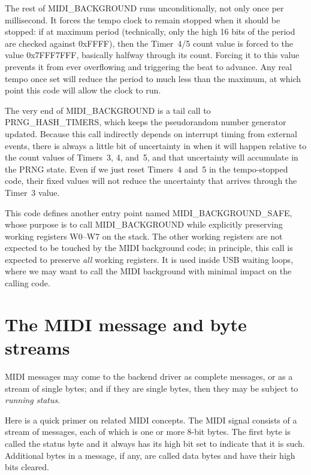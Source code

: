 The rest of MIDI\_BACKGROUND runs unconditionally, not only once per
millisecond.  It forces the tempo clock to remain stopped when it should be
stopped:  if at maximum period (technically, only the high 16 bits of the
period are checked against 0xFFFF), then the Timer~4/5 count value is forced
to the value 0x7FFF7FFF, basically halfway through its count.  Forcing it to
this value prevents it from ever overflowing and triggering the beat to
advance.  Any real tempo once set will reduce the period to much less than
the maximum, at which point this code will allow the clock to run.

The very end of MIDI\_BACKGROUND is a tail call to PRNG\_HASH\_TIMERS, which
keeps the pseudorandom number generator updated.  Because this call
indirectly depends on interrupt timing from external events, there is always
a little bit of uncertainty in when it will happen relative to the count
values of Timers~3, 4, and~5, and that uncertainty will accumulate in the
PRNG state.  Even if we just reset Timers~4 and~5 in the tempo-stopped code,
their fixed values will not reduce the uncertainty that arrives through the
Timer~3 value.

This code defines another entry point named MIDI\_BACKGROUND\_SAFE, whose
purpose is to call MIDI\_BACKGROUND while explicitly preserving working
registers W0--W7 on the stack.  The other working registers are not expected
to be touched by the MIDI background code; in principle, this call is
expected to preserve \emph{all} working registers.  It is used inside USB
waiting loops, where we may want to call the MIDI background with minimal
impact on the calling code.

\section{The MIDI message and byte streams}

MIDI messages may come to the backend driver as complete messages, or as a
stream of single bytes; and if they are single bytes, then they may be
subject to \emph{running status}.

Here is a quick primer on related MIDI concepts.  The MIDI signal consists
of a stream of messages, each of which is one or more 8-bit bytes.  The
first byte is called the status byte and it always has its high bit set to
indicate that it is such.  Additional bytes in a message, if any, are called
data bytes and have their high bits cleared.

